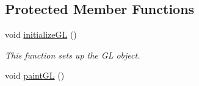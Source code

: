 \subsection*{Protected Member Functions}
\begin{DoxyCompactItemize}
\item 
void \hyperlink{classGLWidget_a7fab13e8cc9fc0730ca54c08b2c923a7}{initialize\+G\+L} ()
\begin{DoxyCompactList}\small\item\em This function sets up the G\+L object. \end{DoxyCompactList}\item 
\hypertarget{classGLWidget_a640b5570cb2b37724fd5b58a77339c5e}{}void \hyperlink{classGLWidget_a640b5570cb2b37724fd5b58a77339c5e}{paint\+G\+L} ()\label{classGLWidget_a640b5570cb2b37724fd5b58a77339c5e}


\end{DoxyCompactItemize}
